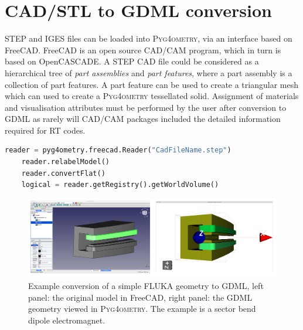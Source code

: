 \documentclass[final,5p,times,twocolumn]{elsarticle}
\newcommand{\PYGEOMETRY}{\textsc{Pyg4ometry}}
\begin{document}
\section{CAD/STL to GDML conversion }
STEP and IGES files can be loaded into \PYGEOMETRY{}, via an interface based on FreeCAD. FreeCAD is an 
open source CAD/CAM program, which in turn is based on OpenCASCADE. A STEP CAD file could be 
considered as a hierarchical tree of {\it part assemblies} and {\it part features}, where a part assembly is a 
collection of part features. A part feature can be used to create  a triangular mesh which can used to create 
a \PYGEOMETRY{} tessellated solid. Assignment of materials and visualisation attributes must be performed by 
the user after conversion to GDML as rarely will CAD/CAM packages included the detailed information required 
for RT codes.
\begin{lstlisting}[caption={A simple \PYGEOMETRY{} Python script to load a STEP file.},label={lst:pythonCADLoading}, language=Python]
    reader = pyg4ometry.freecad.Reader("CadFileName.step")
    reader.relabelModel()
    reader.convertFlat()
    logical = reader.getRegistry().getWorldVolume()
\end{lstlisting}

\begin{figure}
\begin{center}
\includegraphics[width=1.0\textwidth]{./model-scene/SectorBend.pdf}
\caption{Example conversion of a simple FLUKA geometry to GDML, left panel:  
the original model in FreeCAD, right panel: the GDML geometry 
viewed in \PYGEOMETRY{}. The example is a sector bend dipole electromagnet.}
\label{fig:cad-gdml}
\end{center}
\end{figure}
\end{document}
